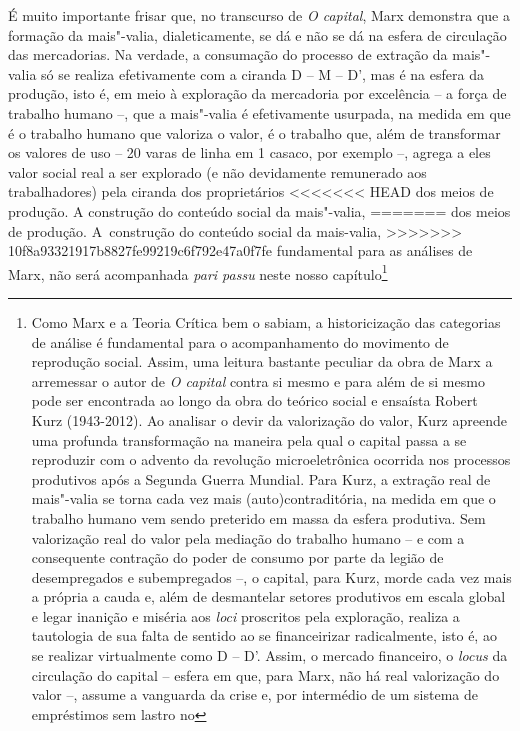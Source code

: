 {É muito importante frisar que, no transcurso de \emph{O capital}, Marx
demonstra que a formação da mais"-valia, dialeticamente, se dá e não se
dá na esfera de circulação das mercadorias. Na verdade, a consumação do
processo de extração da mais"-valia só se realiza efetivamente com a
ciranda D -- M -- D', mas é na esfera da produção, isto é, em meio à
exploração da mercadoria por excelência -- a força de trabalho humano
--, que a mais"-valia é efetivamente usurpada, na medida em que é o
trabalho humano que valoriza o valor, é o trabalho que, além de
transformar os valores de uso -- 20 varas de linha em 1 casaco, por
exemplo --, agrega a eles valor social real a ser explorado (e não
devidamente remunerado aos trabalhadores) pela ciranda dos proprietários
<<<<<<< HEAD
dos meios de produção. A construção do conteúdo social da mais"-valia,
=======
dos meios de produção. A~construção do conteúdo social da mais-valia,
>>>>>>> 10f8a93321917b8827fe99219c6f792e47a0f7fe
fundamental para as análises de Marx, não será acompanhada \emph{pari
passu} neste nosso capítulo\footnote{Como Marx e a Teoria Crítica bem o
  sabiam, a historicização das categorias de análise é fundamental para
  o acompanhamento do movimento de reprodução social. Assim, uma leitura
  bastante peculiar da obra de Marx a arremessar o autor de \emph{O
  capital} contra si mesmo e para além de si mesmo pode ser encontrada
  ao longo da obra do teórico social e ensaísta Robert Kurz (1943-2012).
  Ao analisar o devir da valorização do valor, Kurz apreende uma
  profunda transformação na maneira pela qual o capital passa a se
  reproduzir com o advento da revolução microeletrônica ocorrida nos
  processos produtivos após a Segunda Guerra Mundial. Para Kurz, a
  extração real de mais"-valia se torna cada vez mais
  (auto)contraditória, na medida em que o trabalho humano vem sendo
  preterido em massa da esfera produtiva. Sem valorização real do valor
  pela mediação do trabalho humano -- e com a consequente contração do
  poder de consumo por parte da legião de desempregados e subempregados
  --, o capital, para Kurz, morde cada vez mais a própria a cauda e,
  além de desmantelar setores produtivos em escala global e legar
  inanição e miséria aos \emph{loci} proscritos pela exploração, realiza
  a tautologia de sua falta de sentido ao se financeirizar radicalmente,
  isto é, ao se realizar virtualmente como D -- D'. Assim, o mercado
  financeiro, o \emph{locus} da circulação do capital -- esfera em que,
  para Marx, não há real valorização do valor --, assume a vanguarda da
  crise e, por intermédio de um sistema de empréstimos sem lastro no
}}
